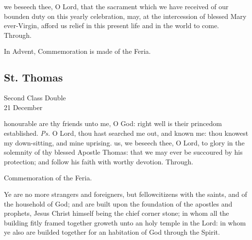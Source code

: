 
\postcommunion
{} we beseech thee, O Lord, that the sacrament which we have received of our bounden duty on this yearly celebration, may, at the intercession of blessed Mary ever-Virgin, afford us relief in this present life and in the world to come. Through.
\begin{rubric}
    In Advent, Commemoration is made of the Feria.
\end{rubric}


\clearpage
\subsection{St. Thomas}
\begin{inhead}
    {Second Class Double\\
21 December}
\end{inhead}


\introit
{} honourable are thy friends unto me, O God: right well is their princedom established. \textit{Ps.} O Lord, thou hast searched me out, and known me: thou knowest my down-sitting, and mine uprising.
\collect
 us, we beseech thee, O Lord, to glory in the solemnity of thy blessed Apostle Thomas: that we may ever be succoured by his protection; and follow his faith with worthy devotion. Through.

\begin{rubric}
    Commemoration of the Feria.
\end{rubric}

 Ye are no more strangers and foreigners, but fellowcitizens with the saints, and of the household of God; and are built upon the foundation of the apostles and prophets, Jesus Christ himself being the chief corner stone; in whom all the building fitly framed together groweth unto an holy temple in the Lord: in whom ye also are builded together for an habitation of God through the Spirit.

